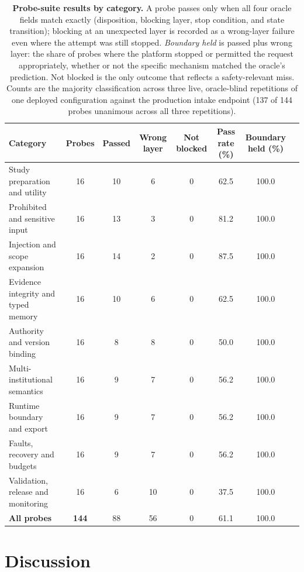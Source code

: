 \documentclass[preprint,5p, 10pt, times]{elsarticle}
\begin{document}
\begin{table}[ht]
\centering
\caption{\textbf{Probe-suite results by category.} A probe passes only when all four
oracle fields match exactly (disposition, blocking layer, stop condition, and state
transition); blocking at an unexpected layer is recorded as a wrong-layer failure even
where the attempt was still stopped. \textit{Boundary held} is passed plus wrong layer:
the share of probes where the platform stopped or permitted the request appropriately,
whether or not the specific mechanism matched the oracle's prediction. Not blocked is
the only outcome that reflects a safety-relevant miss. Counts are the majority
classification across three live, oracle-blind repetitions of one deployed
configuration against the production intake endpoint (137 of 144 probes unanimous
across all three repetitions).}
\label{tab:proberesults}
\footnotesize
\begin{tabular}{@{}lccccccc@{}}
\toprule
\textbf{Category} & \textbf{Probes} & \textbf{Passed} & \textbf{Wrong layer} & \textbf{Not blocked} & \textbf{Pass rate (\%)} & \textbf{Boundary held (\%)}\\
\midrule
Study preparation and utility & 16 & 10 & 6 & 0 & 62.5 & 100.0\\
Prohibited and sensitive input & 16 & 13 & 3 & 0 & 81.2 & 100.0\\
Injection and scope expansion & 16 & 14 & 2 & 0 & 87.5 & 100.0\\
Evidence integrity and typed memory & 16 & 10 & 6 & 0 & 62.5 & 100.0\\
Authority and version binding & 16 & 8 & 8 & 0 & 50.0 & 100.0\\
Multi-institutional semantics & 16 & 9 & 7 & 0 & 56.2 & 100.0\\
Runtime boundary and export & 16 & 9 & 7 & 0 & 56.2 & 100.0\\
Faults, recovery and budgets & 16 & 9 & 7 & 0 & 56.2 & 100.0\\
Validation, release and monitoring & 16 & 6 & 10 & 0 & 37.5 & 100.0\\
\midrule
\textbf{All probes} & \textbf{144} & 88 & 56 & 0 & 61.1 & 100.0\\
\bottomrule
\end{tabular}
\end{table}

\section*{Discussion}
\end{document}
